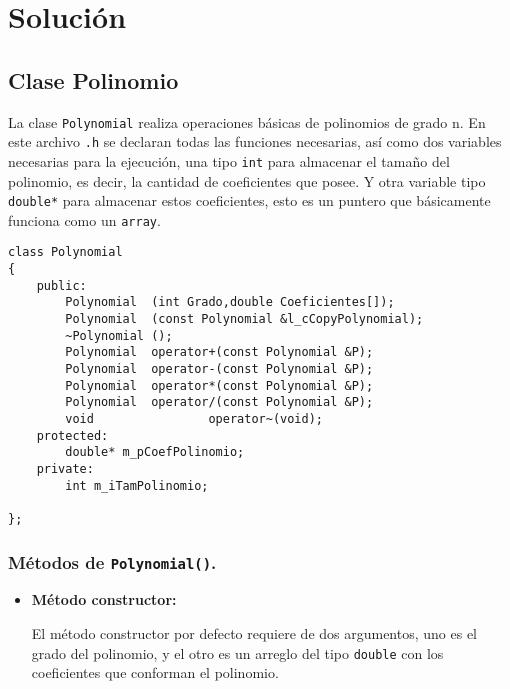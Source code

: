 \newpage

 


\section{Solución}

\subsection{Clase Polinomio}

La clase \texttt{Polynomial} realiza operaciones básicas de polinomios de grado n. En este archivo \texttt{.h} se declaran todas las funciones necesarias, así como dos variables necesarias para la ejecución, una tipo \texttt{int} para almacenar el tamaño del polinomio, es decir, la cantidad de coeficientes que posee. Y otra variable tipo \texttt{double*} para almacenar estos coeficientes, esto es un puntero que básicamente funciona como un \texttt{array}.

\begin{verbatim}
class Polynomial
{
	public:
		Polynomial	(int Grado,double Coeficientes[]);
		Polynomial	(const Polynomial &l_cCopyPolynomial);
		~Polynomial	();
		Polynomial 	operator+(const Polynomial &P);
		Polynomial 	operator-(const Polynomial &P);
		Polynomial 	operator*(const Polynomial &P);
		Polynomial	operator/(const Polynomial &P);
		void 				operator~(void);
	protected:
		double* m_pCoefPolinomio;
	private:
		int m_iTamPolinomio;

};

\end{verbatim}

\subsubsection{Métodos de \texttt{Polynomial()}.}
\begin{itemize}
    \item \textbf{Método constructor:}
    
    El método constructor por defecto requiere de dos argumentos, uno es el grado del polinomio, y el otro es un arreglo del tipo \texttt{double} con los coeficientes que conforman el polinomio.  
\end{itemize}


